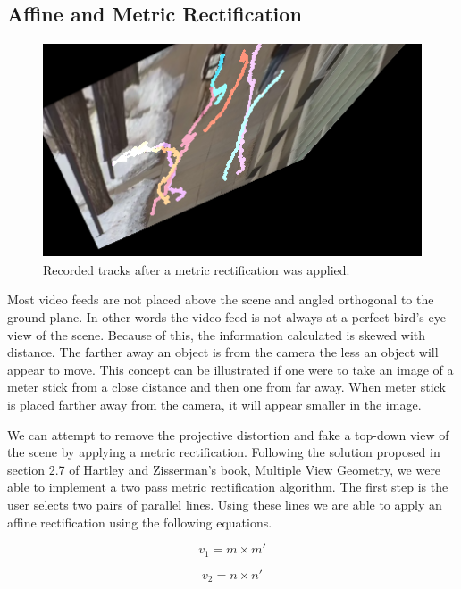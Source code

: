 \documentclass[12pt, onecolumn, conference]{IEEEtran}
\begin{document}
\subsection{Affine and Metric Rectification}

\begin{figure}[!b]
\centering
\includegraphics[height=2.5in]{Screenshots/HaarCascade_HomographyAppliedTracks.png}
\caption{Recorded tracks after a metric rectification was applied.}
\label{Rectification}
\end{figure}

Most video feeds are not placed above the scene and angled orthogonal to the ground plane. In other words the video feed is not always at a perfect bird's eye view of the scene. Because of this, the information calculated is skewed with distance. The farther away an object is from the camera the less an object will appear to move. This concept can be illustrated if one were to take an image of a meter stick from a close distance and then one from far away. When meter stick is placed farther away from the camera, it will appear smaller in the image.


We can attempt to remove the projective distortion and fake a top-down view of the scene by applying a metric rectification. Following the solution proposed in section 2.7 of Hartley and Zisserman's book, Multiple View Geometry, we were able to implement a two pass metric rectification algorithm. The first step is the user selects two pairs of parallel lines. Using these lines we are able to apply an affine rectification using the following equations.

\begin{equation}
v_1 = m \times m'
\end{equation}

\begin{equation}
v_2 = n \times n'
\end{equation}
\end{document}

